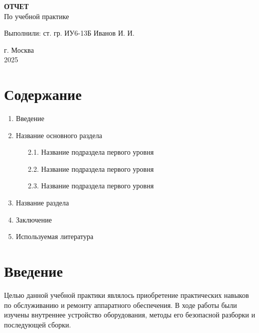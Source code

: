\documentclass[a4paper,14pt]{article}
\begin{document}
\begin{center}
\textbf{ОТЧЕТ} \\
\vspace{0.5cm}
По учебной практике \\
\vspace{4cm}
\end{center}

\begin{flushright}
Выполнили: ст. гр. ИУ6-13Б Иванов И. И. \\
\end{flushright}

\vspace{16cm}

\begin{center}
г. Москва \\
\vspace{1cm}
2025
\end{center}

\newpage

\section*{Содержание}
\begin{enumerate}
\item Введение
\item Название основного раздела
    \begin{enumerate}
    \item[2.1.] Название подраздела первого уровня
    \item[2.2.] Название подраздела первого уровня
    \item[2.3.] Название подраздела первого уровня
    \end{enumerate}
\item Название раздела
\item Заключение
\item Используемая литература
\end{enumerate}

\newpage

\section{Введение}

Целью данной учебной практики являлось приобретение практических навыков по обслуживанию и ремонту аппаратного обеспечения. В ходе работы были изучены внутреннее устройство оборудования, методы его безопасной разборки и последующей сборки.
\end{document}
